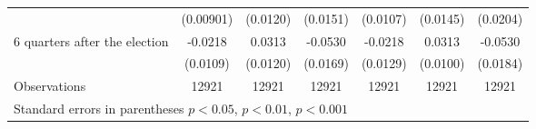 \begin{table}[!ht]
\begin{tabular}{l*{6}{c}}
                    &   (0.00901)         &    (0.0120)         &    (0.0151)         &    (0.0107)         &    (0.0145)         &    (0.0204)         \\
[0,5em]
 6 quarters after the election&     -0.0218\sym{*}  &      0.0313\sym{**} &     -0.0530\sym{**} &     -0.0218         &      0.0313\sym{**} &     -0.0530\sym{**} \\
                    &    (0.0109)         &    (0.0120)         &    (0.0169)         &    (0.0129)         &    (0.0100)         &    (0.0184)         \\
\hline
Observations        &       12921         &       12921         &       12921         &       12921         &       12921         &       12921         \\
\hline\hline
\multicolumn{7}{l}{\footnotesize Standard errors in parentheses \sym{*} \(p<0.05\), \sym{**} \(p<0.01\), \sym{***} \(p<0.001\)}\\
\end{tabular}
\end{table}
